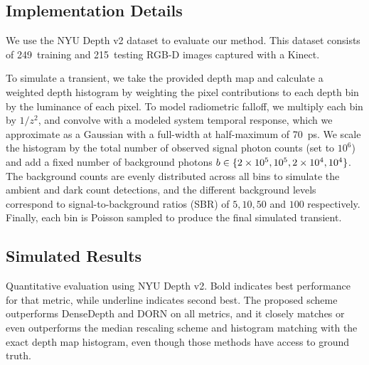 \subsection{Implementation Details}

We use the NYU Depth v2 dataset to evaluate our method. This dataset consists of
249~training and 215~testing RGB-D images captured with a Kinect.

To simulate a transient, we take the provided depth map and calculate a weighted
depth histogram by weighting the pixel contributions to each depth bin by the
luminance of each pixel. To model radiometric falloff, we multiply each bin by
$1/z^2$, and convolve with a modeled system temporal response, which we
approximate as a Gaussian with a full-width at half-maximum of 70~ps. We scale
the histogram by the total number of observed signal photon counts (set to
$10^6$) and  add a fixed number of background photons
$b \in \{2\times 10^5, 10^5, 2\times 10^4, 10^4\}$. The background counts are
evenly distributed across all bins to simulate the ambient and dark count
detections, and the different background levels correspond to
signal-to-background ratios (SBR) of $5, 10, 50$ and $100$ respectively.
Finally, each bin is Poisson sampled to produce the final simulated transient.


\subsection{Simulated Results}
\begin{table*}[!t]
  \begin{center}
      
\caption{
  Quantitative evaluation using NYU Depth v2. Bold indicates best
performance for that metric, while underline indicates second best. The proposed
scheme outperforms DenseDepth and DORN on all metrics, and it closely matches or
even outperforms the median rescaling scheme and histogram matching with the
exact depth map histogram, even though those methods have access to ground
truth. }
\label{tab:comparison}
\end{center}
\end{table*}

